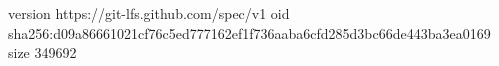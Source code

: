 version https://git-lfs.github.com/spec/v1
oid sha256:d09a86661021cf76c5ed777162ef1f736aaba6cfd285d3bc66de443ba3ea0169
size 349692
